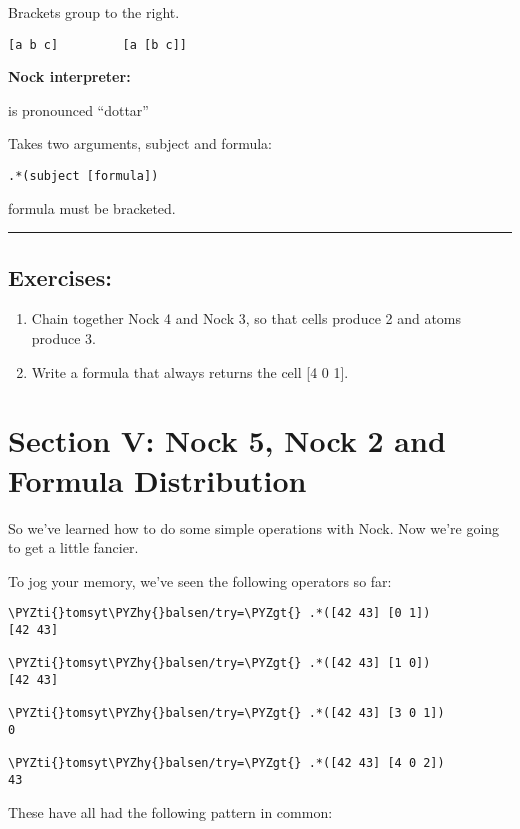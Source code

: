 Brackets group to the right.
\begin{framed_shaded}
\begin{Verbatim}[fontsize=\relsize{-2.5},fontseries=b,commandchars=\\\{\}]
[a b c]         [a [b c]]
\end{Verbatim}
\end{framed_shaded}

\textbf{Nock interpreter:}

 is pronounced ``dottar''

Takes two arguments, subject and formula:
\begin{framed_shaded}
\begin{Verbatim}[fontsize=\relsize{-2.5},fontseries=b,commandchars=\\\{\}]
.*(subject [formula])
\end{Verbatim}
\end{framed_shaded}
formula must be bracketed.

\begin{center}
\rule{3in}{0.4pt}
\end{center}

\subsection{Exercises:}

\begin{enumerate}
\item Chain together Nock 4 and Nock 3, so that cells produce 2 and atoms produce 3.
\item Write a formula that always returns the cell [4 0 1].
\end{enumerate}

\section{Section V: Nock 5, Nock 2 and Formula Distribution}

So we've learned how to do some simple operations with Nock. Now we're going to get a little fancier.

To jog your memory, we've seen the following operators so far:

\begin{framed_shaded}
\begin{Verbatim}[fontsize=\relsize{-2.5},fontseries=b,commandchars=\\\{\}]
\PYZti{}tomsyt\PYZhy{}balsen/try=\PYZgt{} .*([42 43] [0 1])
[42 43]

\PYZti{}tomsyt\PYZhy{}balsen/try=\PYZgt{} .*([42 43] [1 0])
[42 43]

\PYZti{}tomsyt\PYZhy{}balsen/try=\PYZgt{} .*([42 43] [3 0 1])
0

\PYZti{}tomsyt\PYZhy{}balsen/try=\PYZgt{} .*([42 43] [4 0 2])
43
\end{Verbatim}
\end{framed_shaded}
These have all had the following pattern in common:

